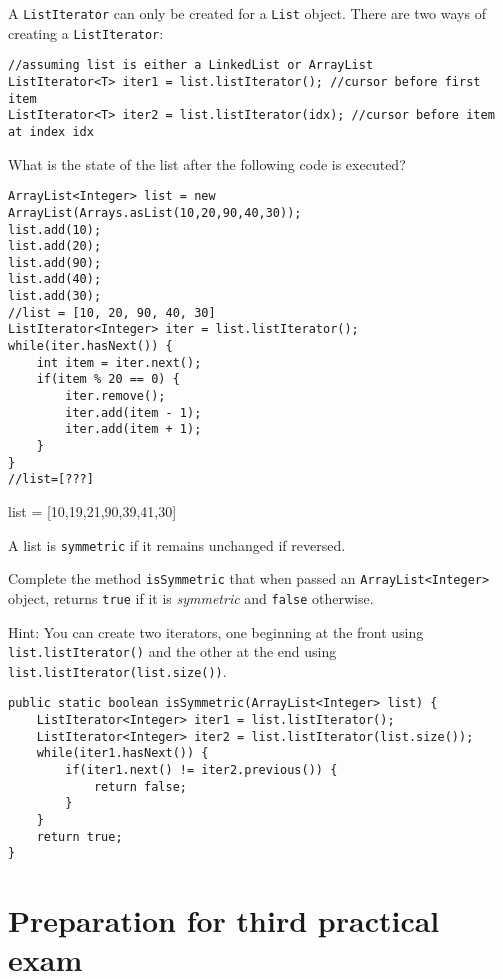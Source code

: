 \documentclass{exam}
\begin{document}
\begin{questions}
A \texttt{ListIterator} can only be created for a \texttt{List} object. There are two ways of creating a \texttt{ListIterator}:

\begin{lstlisting}
//assuming list is either a LinkedList or ArrayList
ListIterator<T> iter1 = list.listIterator(); //cursor before first item
ListIterator<T> iter2 = list.listIterator(idx); //cursor before item at index idx
\end{lstlisting} 

\ifprintanswers
\else
\newpage
\fi

What is the state of the list after the following code is executed?

\begin{lstlisting}
ArrayList<Integer> list = new ArrayList(Arrays.asList(10,20,90,40,30));
list.add(10);
list.add(20);
list.add(90);
list.add(40);
list.add(30);
//list = [10, 20, 90, 40, 30]
ListIterator<Integer> iter = list.listIterator();
while(iter.hasNext()) {
	int item = iter.next();
	if(item % 20 == 0) {
		iter.remove();
		iter.add(item - 1);
		iter.add(item + 1);
	}
}
//list=[???]
\end{lstlisting}

\ifprintanswers
list = [10,19,21,90,39,41,30]
\else
\fi

\question 

A list is \texttt{symmetric} if it remains unchanged if reversed.

Complete the method \texttt{isSymmetric} that when passed an \texttt{ArrayList<Integer>} object, returns \texttt{true} if it is \emph{symmetric} and \texttt{false} otherwise. 

Hint: You can create two iterators, one beginning at the front using \texttt{list.listIterator()} and the other at the end using \texttt{list.listIterator(list.size())}.

\ifprintanswers
\begin{lstlisting}
public static boolean isSymmetric(ArrayList<Integer> list) {
	ListIterator<Integer> iter1 = list.listIterator();
	ListIterator<Integer> iter2 = list.listIterator(list.size());
	while(iter1.hasNext()) {
		if(iter1.next() != iter2.previous()) {
			return false;
		}
	}
	return true;
}
\end{lstlisting}
\else
\fi
\end{questions}

\newpage

\section*{Preparation for third practical exam}
\end{document}
